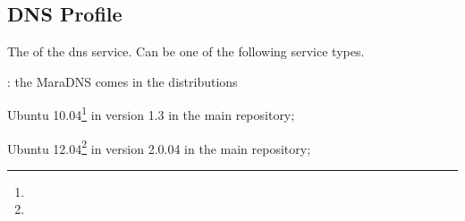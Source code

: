\label{sec:dns_profile}
\subsection{DNS Profile}


The  of the dns service. Can be one of the following 
service types.
\begin{asparaitem}
%
\item[\qcode{maradns}:] 
the MaraDNS comes in the distributions 
\begin{compactitem}
\item[\TheDistribution{ubuntu}] Ubuntu 10.04\footnote{\TheUbuntuMaverickLTSDate} in version 1.3 in the main repository;
\item[\TheDistribution{ubuntu}] Ubuntu 12.04\footnote{\TheUbuntuPreciseLTSDate} in version 2.0.04 in the main repository;
\end{compactitem}
%
\end{asparaitem}

